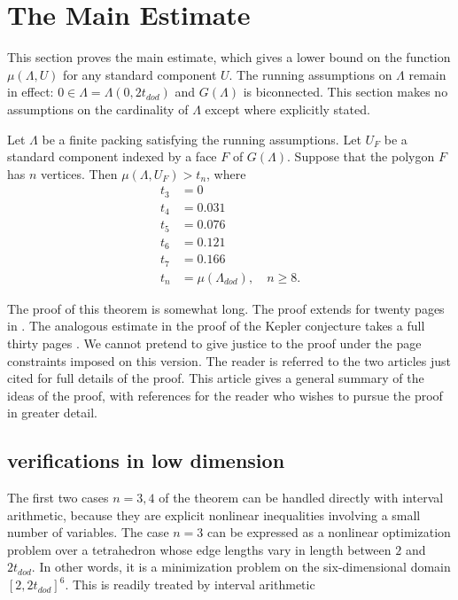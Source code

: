 \section{The Main Estimate}

This section proves the main estimate, which gives a lower
bound on the function $\mu(\Lambda,U)$ for any standard component $U$.
The running
assumptions on $\Lambda$ remain in effect: $0\in\Lambda= \Lambda(0,2t_{dod})$ and $G(\Lambda)$ is  biconnected.  This section makes
no assumptions on the cardinality 
of $\Lambda$ except where explicitly stated.

\begin{theorem}\label{thm:main}  
Let $\Lambda$ be a finite packing satisfying the
running assumptions.  Let $U_F$ be a standard component indexed by
a face $F$ of $G(\Lambda)$.  Suppose that the polygon 
$F$ has $n$ vertices.  Then
   $\mu(\Lambda,U_F) > t_n$, where 
$$
\begin{array}{lll}
 t_3 &= 0\\
 t_4 &= 0.031\\
 t_5 &= 0.076\\
 t_6 &= 0.121\\
 t_7 &= 0.166\\
 t_n &= \mu(\Lambda_{dod}),\quad n\ge 8.
\end{array}
$$
\end{theorem}

The proof of this theorem is somewhat long.  The proof extends for 
twenty pages in  \cite[pp.19-38]{arx}.  The analogous estimate in
the proof of the Kepler conjecture takes a full thirty pages 
\cite[pp.126-156]{DCG}.
We cannot pretend to give justice to the proof under the page constraints
imposed on this version.  The reader is referred to the
two articles just cited for full details of the proof.  This article
 gives a general summary of the ideas of the proof, with 
references for the reader who wishes to pursue the proof in greater detail.

\subsection{verifications in low dimension}

The first two cases $n=3,4$ of the theorem can be handled directly with
interval arithmetic, because they are explicit nonlinear 
inequalities involving a small number of variables.  The case $n=3$ can
be expressed as a nonlinear optimization problem over a tetrahedron
whose edge lengths vary in length between $2$ and $2t_{dod}$.  In other
words, it is a minimization problem on the six-dimensional 
domain $[2,2t_{dod}]^6$. This is readily treated by interval arithmetic \cite[XX]{code}

